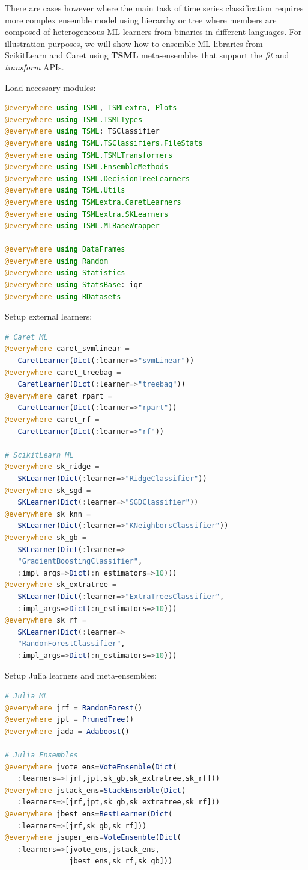 \documentclass{juliacon}
\begin{document}
There are cases however where the main task of time series classification 
requires more complex ensemble model using hierarchy or tree where 
members are composed of heterogeneous ML learners from binaries in 
different languages. For illustration purposes, we will show how to 
ensemble ML libraries from ScikitLearn and Caret using \textbf{TSML} 
meta-ensembles that support the \emph{fit} and \emph{transform} APIs.

\vskip 6pt

Load necessary modules:
\begin{lstlisting}[language = Julia]
@everywhere using TSML, TSMLextra, Plots
@everywhere using TSML.TSMLTypes
@everywhere using TSML: TSClassifier
@everywhere using TSML.TSClassifiers.FileStats
@everywhere using TSML.TSMLTransformers
@everywhere using TSML.EnsembleMethods
@everywhere using TSML.DecisionTreeLearners
@everywhere using TSML.Utils
@everywhere using TSMLextra.CaretLearners
@everywhere using TSMLextra.SKLearners
@everywhere using TSML.MLBaseWrapper

@everywhere using DataFrames
@everywhere using Random
@everywhere using Statistics
@everywhere using StatsBase: iqr
@everywhere using RDatasets
\end{lstlisting}

Setup external learners:
\begin{lstlisting}[language = Julia]
# Caret ML
@everywhere caret_svmlinear = 
   CaretLearner(Dict(:learner=>"svmLinear"))
@everywhere caret_treebag = 
   CaretLearner(Dict(:learner=>"treebag"))
@everywhere caret_rpart = 
   CaretLearner(Dict(:learner=>"rpart"))
@everywhere caret_rf = 
   CaretLearner(Dict(:learner=>"rf"))

# ScikitLearn ML
@everywhere sk_ridge = 
   SKLearner(Dict(:learner=>"RidgeClassifier"))
@everywhere sk_sgd = 
   SKLearner(Dict(:learner=>"SGDClassifier"))
@everywhere sk_knn = 
   SKLearner(Dict(:learner=>"KNeighborsClassifier"))
@everywhere sk_gb = 
   SKLearner(Dict(:learner=>
   "GradientBoostingClassifier",
   :impl_args=>Dict(:n_estimators=>10)))
@everywhere sk_extratree = 
   SKLearner(Dict(:learner=>"ExtraTreesClassifier",
   :impl_args=>Dict(:n_estimators=>10)))
@everywhere sk_rf = 
   SKLearner(Dict(:learner=>
   "RandomForestClassifier",
   :impl_args=>Dict(:n_estimators=>10)))
\end{lstlisting}

Setup Julia learners and meta-ensembles:
\begin{lstlisting}[language = Julia]
# Julia ML
@everywhere jrf = RandomForest()
@everywhere jpt = PrunedTree()
@everywhere jada = Adaboost()

# Julia Ensembles
@everywhere jvote_ens=VoteEnsemble(Dict(
   :learners=>[jrf,jpt,sk_gb,sk_extratree,sk_rf]))
@everywhere jstack_ens=StackEnsemble(Dict(
   :learners=>[jrf,jpt,sk_gb,sk_extratree,sk_rf]))
@everywhere jbest_ens=BestLearner(Dict(
   :learners=>[jrf,sk_gb,sk_rf]))
@everywhere jsuper_ens=VoteEnsemble(Dict(
   :learners=>[jvote_ens,jstack_ens,
               jbest_ens,sk_rf,sk_gb]))
\end{lstlisting}
\end{document}
